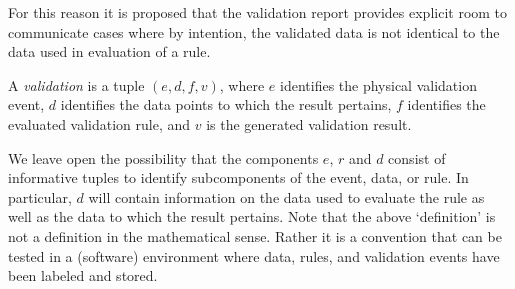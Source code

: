 For this reason it is proposed that the validation report provides explicit
room to communicate cases where by intention, the validated data is not
identical to the data used in evaluation of a rule. 
%
\begin{definition}[validation] 
A \emph{validation} is a tuple $(e,d,f,v)$, where $e$ identifies the
physical validation event, $d$ identifies the data points to which the result
pertains, $f$ identifies the evaluated validation rule, and $v$ is the
generated validation result.
\label{def:confrontation}
\end{definition}
%
We leave open the possibility that the components $e$, $r$ and $d$ consist of
informative tuples to identify subcomponents of the event, data, or rule.  In
particular, $d$ will contain information on the data used to evaluate the rule
as well as the data to which the result pertains. Note that the above
`definition' is not a definition in the mathematical sense.  Rather it is a
convention that can be tested in a (software) environment where data, rules,
and validation events have been labeled and stored.






